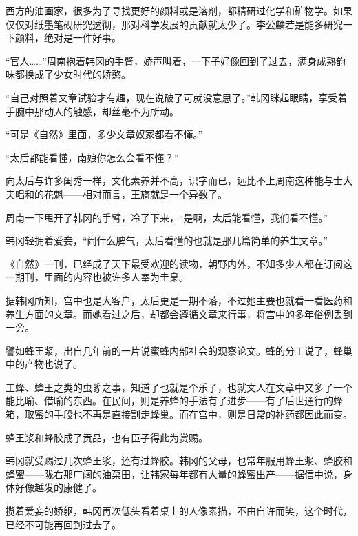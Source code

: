 西方的油画家，很多为了寻找更好的颜料或是溶剂，都精研过化学和矿物学。如果仅仅对纸墨笔砚研究透彻，那对科学发展的贡献就太少了。李公麟若是能多研究一下颜料，绝对是一件好事。

“官人……”周南抱着韩冈的手臂，娇声叫着，一下子好像回到了过去，满身成熟韵味都换成了少女时代的娇憨。

“自己对照着文章试验才有趣，现在说破了可就没意思了。”韩冈眯起眼睛，享受着手腕中那动人的触感，却丝毫不为所动。

“可是《自然》里面，多少文章奴家都看不懂。”

“太后都能看懂，南娘你怎么会看不懂？”

向太后与许多闺秀一样，文化素养并不高，识字而已，远比不上周南这种能与士大夫唱和的花魁——相对而言，王旖就是一个异数了。

周南一下甩开了韩冈的手臂，冷了下来，“是啊，太后能看懂，我们看不懂。”

韩冈轻拥着爱妾，“闹什么脾气，太后看懂的也就是那几篇简单的养生文章。”

《自然》一刊，已经成了天下最受欢迎的读物，朝野内外，不知多少人都在订阅这一期刊，里面的内容也被许多人奉为圭臬。

据韩冈所知，宫中也是大客户，太后更是一期不落，不过她主要也就看一看医药和养生方面的文章。而她看过之后，却都会遵循文章来行事，将宫中的多年俗例丢到一旁。

譬如蜂王浆，出自几年前的一片说蜜蜂内部社会的观察论文。蜂的分工说了，蜂巢中的产物也说了。

工蜂、蜂王之类的虫豸之事，知道了也就是个乐子，也就文人在文章中又多了一个能比喻、借喻的东西。在民间，则是养蜂的手法有了进步——有了后世通行的蜂箱，取蜜的手段也不再是直接割走蜂巢。而在宫中，则是日常的补药都因此而变。

蜂王浆和蜂胶成了贡品，也有臣子得此为赏赐。

韩冈就受赐过几次蜂王浆，还有过蜂胶。韩冈的父母，也常年服用蜂王浆、蜂胶和蜂蜜——陇右那广阔的油菜田，让韩家每年都有大量的蜂蜜出产——据信中说，身体好像越发的康健了。

揽着爱妾的娇躯，韩冈再次低头看着桌上的人像素描，不由自许而笑，这个时代，已经不可能再回到过去了。
